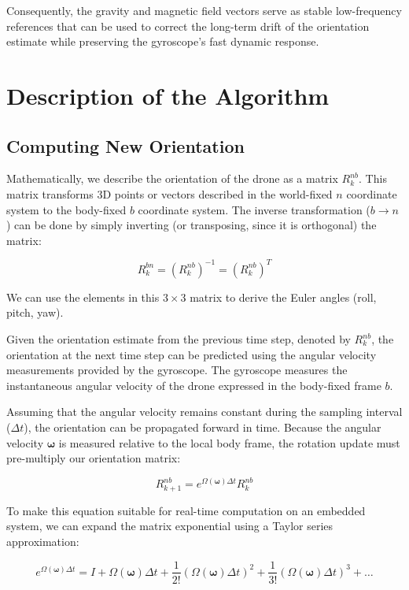 \documentclass{article}
\begin{document}
	\noindent Consequently, the gravity and magnetic field vectors serve as stable low-frequency references that can be used to correct the long-term drift of the orientation estimate while preserving the gyroscope's fast dynamic response.
	
\section{Description of the Algorithm}

\subsection{Computing New Orientation}

Mathematically, we describe the orientation of the drone as a matrix $R_{k}^{nb}$. This matrix transforms 3D points or vectors described in the world-fixed $n$ coordinate system to the body-fixed $b$ coordinate system. The inverse transformation ($b \rightarrow n$) can be done by simply inverting (or transposing, since it is orthogonal) the matrix:

\[
R^{bn}_k = (R^{nb}_k)^{-1} = (R^{nb}_k)^{T}
\]

\noindent We can use the elements in this $3\times3$ matrix to derive the Euler angles (roll, pitch, yaw).
\vspace{1em}

\noindent Given the orientation estimate from the previous time step, denoted by $R_k^{nb}$, the orientation at the next time step can be predicted using the angular velocity measurements provided by the gyroscope. The gyroscope measures the instantaneous angular velocity of the drone expressed in the body-fixed frame $b$.

\vspace{1em}
\noindent Assuming that the angular velocity remains constant during the sampling interval ($\Delta t$), the orientation can be propagated forward in time. Because the angular velocity $\boldsymbol{\omega}$ is measured relative to the local body frame, the rotation update must pre-multiply our orientation matrix:

\[
R_{k+1}^{nb} = e^{\Omega(\boldsymbol{\omega})\Delta t} R_{k}^{nb}
\]

\noindent To make this equation suitable for real-time computation on an embedded system, we can expand the matrix exponential using a Taylor series approximation:

\[
e^{\Omega(\boldsymbol{\omega})\Delta t} = I + \Omega(\boldsymbol{\omega})\Delta t + \frac{1}{2!}\left(\Omega(\boldsymbol{\omega})\Delta t\right)^2 + \frac{1}{3!}\left(\Omega(\boldsymbol{\omega})\Delta t\right)^3 + \dots
\]
\end{document}
